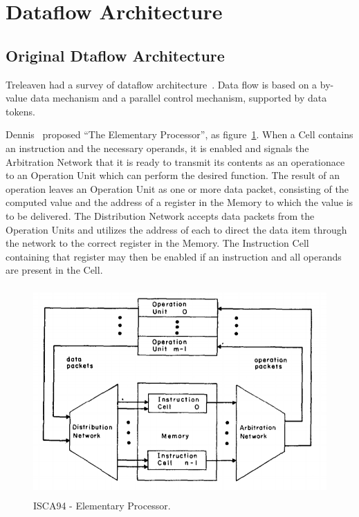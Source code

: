 \documentclass[UTF8,12pt,a4paper]{article}
\begin{document}
\clearpage

\section{Dataflow Architecture}
\label{sec:dataflow_arch}

\subsection{Original Dtaflow Architecture}
Treleaven had a survey of dataflow architecture~\cite{DBLP:journals/csur/TreleavenBH82}.
Data flow is based on a by-value data mechanism
and a parallel control mechanism, supported by data tokens. 

Dennis~\cite{DBLP:conf/isca/DennisM74} proposed ``The Elementary Processor'',
as figure~\ref{fig:elementory_processor}.
When a Cell contains an instruction and the necessary operands,
it is enabled and signals the Arbitration Network
that it is ready to transmit its contents as an operationace
to an Operation Unit which can perform the desired function.
The result of an operation leaves an Operation Unit
as one or more data packet,
consisting of the computed value and the address of a register
in the Memory to which the value is to be delivered.
The Distribution Network accepts data packets
from the Operation Units and utilizes the address of each
to direct the data item through the network to the correct register in the Memory.
The Instruction Cell containing that register may then be enabled
if an instruction and all operands are present in the Cell.

\begin{figure}[htb]
  \begin{small}
    \begin{center}
      \includegraphics[width=\textwidth,height=8cm]{figures/isca94_elementory_processor.png}
    \end{center}
    \caption{ISCA94 - Elementary Processor.}
    \label{fig:elementory_processor}
  \end{small}
\end{figure}
\end{document}
